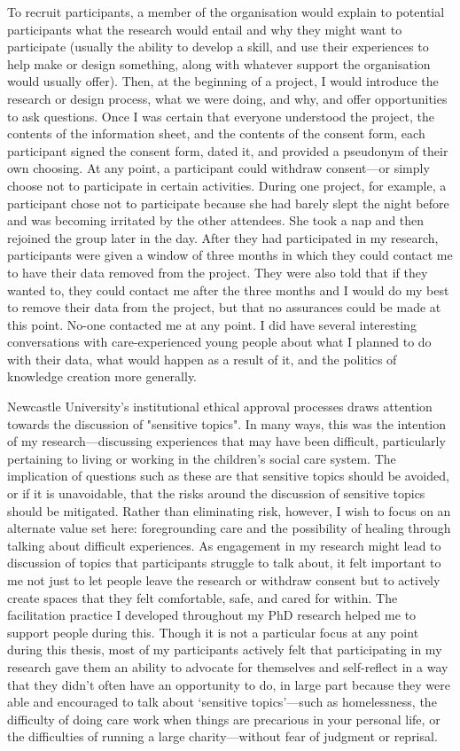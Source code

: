 To recruit participants, a member of the organisation would explain to potential participants what the research would entail and why they might want to participate (usually the ability to develop a skill, and use their experiences to help make or design something, along with whatever support the organisation would usually offer). Then, at the beginning of a project, I would introduce the research or design process, what we were doing, and why, and offer opportunities to ask questions. Once I was certain that everyone understood the project, the contents of the information sheet, and the contents of the consent form, each participant signed the consent form, dated it, and provided a pseudonym of their own choosing. At any point, a participant could withdraw consent—or simply choose not to participate in certain activities. During one project, for example, a participant chose not to participate because she had barely slept the night before and was becoming irritated by the other attendees. She took a nap and then rejoined the group later in the day. After they had participated in my research, participants were given a window of three months in which they could contact me to have their data removed from the project. They were also told that if they wanted to, they could contact me after the three months and I would do my best to remove their data from the project, but that no assurances could be made at this point. No-one contacted me at any point. I did have several interesting conversations with care-experienced young people about what I planned to do with their data, what would happen as a result of it, and the politics of knowledge creation more generally.

Newcastle University’s institutional ethical approval processes draws attention towards the discussion of "sensitive topics". In many ways, this was the intention of my research—discussing experiences that may have been difficult, particularly pertaining to living or working in the children’s social care system. The implication of questions such as these are that sensitive topics should be avoided, or if it is unavoidable, that the risks around the discussion of sensitive topics should be mitigated. Rather than eliminating risk, however, I wish to focus on an alternate value set here: foregrounding care and the possibility of healing through talking about difficult experiences. As engagement in my research might lead to discussion of topics that participants struggle to talk about, it felt important to me not just to let people leave the research or withdraw consent but to actively create spaces that they felt comfortable, safe, and cared for within. The facilitation practice I developed throughout my PhD research helped me to support people during this. Though it is not a particular focus at any point during this thesis, most of my participants actively felt that participating in my research gave them an ability to advocate for themselves and self-reflect in a way that they didn’t often have an opportunity to do, in large part because they were able and encouraged to talk about ‘sensitive topics’—such as homelessness, the difficulty of doing care work when things are precarious in your personal life, or the difficulties of running a large charity—without fear of judgment or reprisal. 

